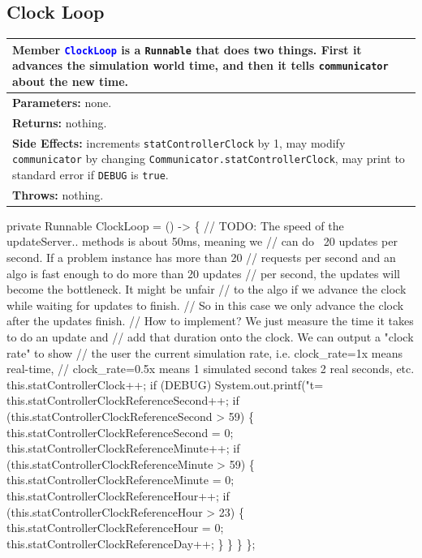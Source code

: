 \subsection{Clock Loop}
\begin{tabular}{p{\textwidth}}
\toprule
\rowcolor{TableTitle}
Member \textcolor{blue}{{\tt{}ClockLoop}} is a {\tt{}Runnable} that does two things.
First it advances the simulation world time, and then it tells {\tt{}communicator}
about the new time.\\
\midrule
\textbf{Parameters:} none.\\
\textbf{Returns:} nothing.\\
\textbf{Side Effects:} increments {\tt{}statControllerClock} by 1, may modify
{\tt{}communicator} by changing {\tt{}Communicator.statControllerClock}, may print to
standard error if {\tt{}DEBUG} is {\tt{}true}.\\
\textbf{Throws:} nothing.\\
\bottomrule
\end{tabular}
\nwenddocs{}\endmoddef{}
private Runnable ClockLoop = () -> \{
  // TODO: The speed of the updateServer.. methods is about 50ms, meaning we
  // can do ~20 updates per second. If a problem instance has more than 20
  // requests per second and an algo is fast enough to do more than 20 updates
  // per second, the updates will become the bottleneck. It might be unfair
  // to the algo if we advance the clock while waiting for updates to finish.
  // So in this case we only advance the clock after the updates finish.
  // How to implement? We just measure the time it takes to do an update and
  // add that duration onto the clock. We can output a "clock rate" to show
  // the user the current simulation rate, i.e. clock_rate=1x means real-time,
  // clock_rate=0.5x means 1 simulated second takes 2 real seconds, etc.
  this.statControllerClock++;
  if (DEBUG) System.out.printf("t=%
  this.statControllerClockReferenceSecond++;
  if (this.statControllerClockReferenceSecond > 59) \{
    this.statControllerClockReferenceSecond = 0;
    this.statControllerClockReferenceMinute++;
    if (this.statControllerClockReferenceMinute > 59) \{
      this.statControllerClockReferenceMinute = 0;
      this.statControllerClockReferenceHour++;
      if (this.statControllerClockReferenceHour > 23) \{
        this.statControllerClockReferenceHour = 0;
        this.statControllerClockReferenceDay++;
      \}
    \}
  \}
\};
\nwendcode{}\nwdocspar

